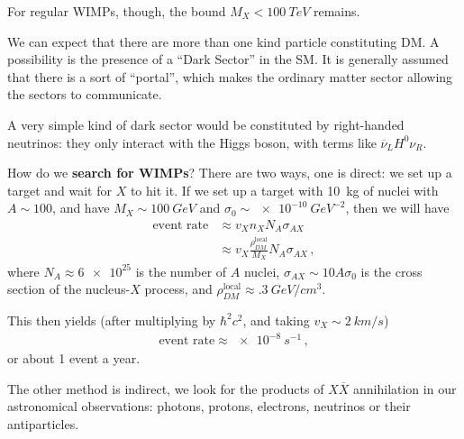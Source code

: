 \documentclass[main.tex]{subfiles}
\begin{document}
For regular WIMPs, though, the bound \(M_X < \SI{100}{TeV}\) remains. 

We can expect that there are more than one kind particle constituting DM.
A possibility is the presence of a ``Dark Sector'' in the SM. 
It is generally assumed that there is a sort of ``portal'', which makes the ordinary matter sector allowing the sectors to communicate.

A very simple kind of dark sector would be constituted by right-handed neutrinos: they only interact with the Higgs boson, with terms like \(\overline{\nu}_{L} H^{0} \nu_{R}\).

How do we \textbf{search for WIMPs}? There are two ways, one is direct: we set up a target and wait for \(X\) to hit it. 
If we set up a target with \SI{10}{kg} of nuclei with \(A \sim 100\), and have \(M_X \sim \SI{100}{GeV}\) and \(\sigma_0 \sim \SI{e-10}{GeV^{-2}}\), then we will have 
%
\begin{align}
\text{event rate} &\approx 
v_X n_X N_A \sigma_{AX}  \\
&\approx v_X \frac{\rho_{DM}^{\text{local}}}{M_X} N_A \sigma_{AX}
\,,
\end{align}
%
where \(N_A \approx \num{6e25}\) is the number of \(A\) nuclei, \(\sigma_{AX} \sim 10 A \sigma_0 \) is the cross section of the nucleus-\(X\) process, and \(\rho_{DM}^{\text{local}} \approx \SI{.3}{GeV / cm^3}\).

This then yields (after multiplying by \(\hbar^2 c^2\), and taking \(v_X \sim  \SI{2}{km/s}\)) 
%
\begin{align}
\text{event rate} \approx \SI{e-8}{s^{-1}}
\,,
\end{align}
%
or about 1 event a year.


    
The other method is indirect, we look for the products of \(X \overline{X}\) annihilation in our astronomical observations: photons, protons, electrons, neutrinos or their antiparticles.
\end{document}
